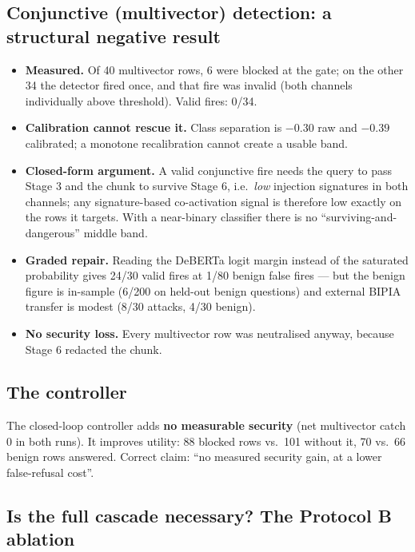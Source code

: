 \documentclass[11pt,a4paper]{article}
\begin{document}
\subsection{Conjunctive (multivector) detection: a structural negative result}\label{sec:conj}

\begin{itemize}
\item \textbf{Measured.} Of 40 multivector rows, 6 were blocked at the gate; on the other 34 the detector fired once,
  and that fire was invalid (both channels individually above threshold). Valid fires: 0/34.
\item \textbf{Calibration cannot rescue it.} Class separation is $-0.30$ raw and $-0.39$ calibrated; a monotone
  recalibration cannot create a usable band.
\item \textbf{Closed-form argument.} A valid conjunctive fire needs the query to pass Stage 3 and the chunk to
  survive Stage 6, i.e.\ \emph{low} injection signatures in both channels; any signature-based co-activation signal
  is therefore low exactly on the rows it targets. With a near-binary classifier there is no
  ``surviving-and-dangerous'' middle band.
\item \textbf{Graded repair.} Reading the DeBERTa logit margin instead of the saturated probability gives 24/30 valid
  fires at 1/80 benign false fires --- but the benign figure is in-sample (6/200 on held-out benign questions) and
  external BIPIA transfer is modest (8/30 attacks, 4/30 benign).
\item \textbf{No security loss.} Every multivector row was neutralised anyway, because Stage 6 redacted the chunk.
\end{itemize}

\subsection{The controller}
The closed-loop controller adds \textbf{no measurable security} (net multivector catch 0 in both runs). It improves
utility: 88 blocked rows vs.\ 101 without it, 70 vs.\ 66 benign rows answered. Correct claim: ``no measured security
gain, at a lower false-refusal cost''.

\subsection{Is the full cascade necessary? The Protocol B ablation}
\end{document}
